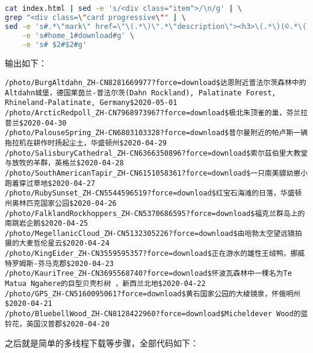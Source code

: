 \documentclass[blue,normal,cn]{elegantnote}
\begin{document}
\begin{lstlisting}[language=bash]
cat index.html | sed -e 's/<div class="item">/\n/g' | \
grep "<div class=\"card progressive\"" | \
sed -e 's#.*\"mark\" href=\"\(.*\)\".*\"description\"><h3>\(.*\)(©.*\([0-9]\{4\}\-[0-9]\{2\}-[0-9]\{2\}\)<.*#\1$\2$\3#g' \
	-e 's#home_1#download#g' \
	-e 's# $2#$2#g'
\end{lstlisting}

输出如下：

\begin{lstlisting}
/photo/BurgAltdahn_ZH-CN8281669977?force=download$达恩附近普法尔茨森林中的Altdahn城堡，德国莱茵兰-普法尔茨(Dahn Rockland), Palatinate Forest, Rhineland-Palatinate, Germany$2020-05-01
/photo/ArcticRedpoll_ZH-CN7968973967?force=download$极北朱顶雀的巢，芬兰拉普兰$2020-04-30
/photo/PalouseSpring_ZH-CN6803103328?force=download$普尔曼附近的帕卢斯一辆拖拉机在耕作时扬起尘土，华盛顿州$2020-04-29
/photo/SalisburyCathedral_ZH-CN6366350896?force=download$索尔茲伯里大教堂与放牧的羊群，英格兰$2020-04-28
/photo/SouthAmericanTapir_ZH-CN6151058361?force=download$一只南美貘幼崽小跑着穿过草地$2020-04-27
/photo/RubySunset_ZH-CN5544596519?force=download$红宝石海滩的日落，华盛顿州奥林匹克国家公园$2020-04-26
/photo/FalklandRockhoppers_ZH-CN5370686595?force=download$福克兰群岛上的南跳岩企鹅$2020-04-25
/photo/MegellanicCloud_ZH-CN5132305226?force=download$由哈勃太空望远镜拍摄的大麦哲伦星云$2020-04-24
/photo/KingEider_ZH-CN3559595357?force=download$正在游水的雄性王绒鸭，挪威特罗姆斯-芬马克郡$2020-04-23
/photo/KauriTree_ZH-CN3695568740?force=download$怀波瓦森林中一棵名为Te Matua Ngahere的巨型贝壳杉树 ，新西兰北地$2020-04-22
/photo/GPS_ZH-CN5160095061?force=download$黄石国家公园的大棱镜泉，怀俄明州$2020-04-21
/photo/BluebellWood_ZH-CN8128422960?force=download$Micheldever Wood的蓝铃花，英国汉普郡$2020-04-20
\end{lstlisting}

之后就是简单的多线程下载等步骤，全部代码如下：
\end{document}
